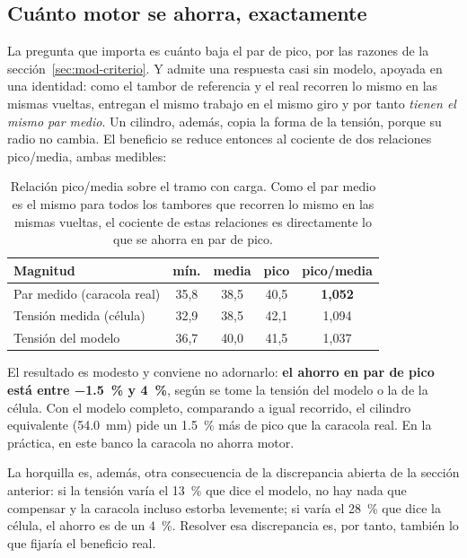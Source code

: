 \subsection{Cuánto motor se ahorra, exactamente}
\label{sec:res-ahorro}

La pregunta que importa es cuánto baja el par de pico, por las razones de la
sección~\ref{sec:mod-criterio}. Y admite una respuesta casi sin modelo, apoyada en una identidad:
como el tambor de referencia y el real recorren lo mismo en las mismas vueltas, entregan el mismo
trabajo en el mismo giro y por tanto \emph{tienen el mismo par medio}. Un cilindro, además, copia la
forma de la tensión, porque su radio no cambia. El beneficio se reduce entonces al cociente de dos
relaciones pico/media, ambas medibles:

\begin{table}[H]
\centering
\caption{Relación pico/media sobre el tramo con carga. Como el par medio es el mismo para todos los
tambores que recorren lo mismo en las mismas vueltas, el cociente de estas relaciones es
directamente lo que se ahorra en par de pico.}
\label{tab:picomedia}
\begin{tabular}{@{}lcccc@{}}
\toprule
Magnitud & mín. & media & pico & pico/media \\
\midrule
Par medido (caracola real) & 35,8 & 38,5 & 40,5 & \textbf{1,052} \\
Tensión medida (célula) & 32,9 & 38,5 & 42,1 & 1,094 \\
Tensión del modelo & 36,7 & 40,0 & 41,5 & 1,037 \\
\bottomrule
\end{tabular}
\end{table}

El resultado es modesto y conviene no adornarlo: \textbf{el ahorro en par de pico está entre
\SI{-1.5}{\percent} y \SI{+4}{\percent}}, según se tome la tensión del modelo o la de la célula. Con
el modelo completo, comparando a igual recorrido, el cilindro equivalente (\SI{54.0}{\milli\metre})
pide un \SI{1.5}{\percent} más de pico que la caracola real. En la práctica, en este banco la
caracola no ahorra motor.

La horquilla es, además, otra consecuencia de la discrepancia abierta de la sección anterior: si la
tensión varía el \SI{13}{\percent} que dice el modelo, no hay nada que compensar y la caracola
incluso estorba levemente; si varía el \SI{28}{\percent} que dice la célula, el ahorro es de un
\SI{4}{\percent}. Resolver esa discrepancia es, por tanto, también lo que fijaría el beneficio real.

